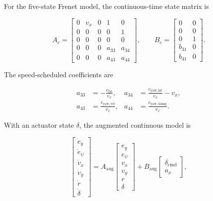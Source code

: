 \documentclass[9pt]{article}
\begin{document}
For the five-state Frenet model, the continuous-time state matrix is

\begin{equation}
A_c=
\begin{bmatrix}
0 & v_x & 0 & 1 & 0\\
0 & 0 & 0 & 0 & 1\\
0 & 0 & 0 & 0 & 0\\
0 & 0 & 0 & a_{33} & a_{34}\\
0 & 0 & 0 & a_{43} & a_{44}
\end{bmatrix},
\qquad
B_c=
\begin{bmatrix}
0 & 0\\
0 & 0\\
0 & 1\\
b_{31} & 0\\
b_{41} & 0
\end{bmatrix}.
\label{eq:continuous-matrices}
\end{equation}

The speed-scheduled coefficients are

\begin{align}
a_{33}&=-\frac{c_{\mathrm{lat}}}{v_x},&
a_{34}&=\frac{c_{\mathrm{yaw,lat}}}{v_x}-v_x,\\
a_{43}&=\frac{c_{\mathrm{yaw,vel}}}{v_x},&
a_{44}&=\frac{c_{\mathrm{yaw,damp}}}{v_x}.
\end{align}

With an actuator state $\delta$, the augmented continuous model is

\begin{equation}
\begin{bmatrix}
\dot e_y\\
\dot e_\psi\\
\dot v_x\\
\dot v_y\\
\dot r\\
\dot\delta
\end{bmatrix}
=
A_{\mathrm{aug}}
\begin{bmatrix}
e_y\\
e_\psi\\
v_x\\
v_y\\
r\\
\delta
\end{bmatrix}
+
B_{\mathrm{aug}}
\begin{bmatrix}
\delta_{\mathrm{cmd}}\\
a_x
\end{bmatrix},
\end{equation}
\end{document}
